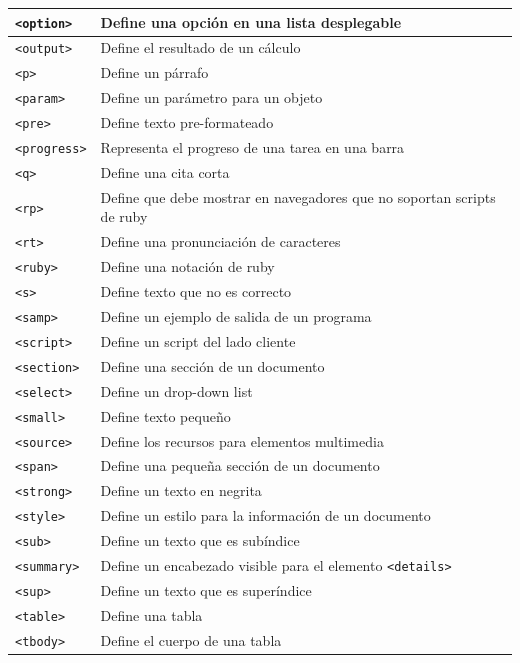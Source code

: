 \documentclass[11pt]{scrartcl}
\begin{document}
\begin{longtable}{|p{}|p{}|}
\texttt{<option>} & Define una opción en una lista desplegable \\
\hline
\texttt{<output>} & Define el resultado de un cálculo \\
\hline
\texttt{<p>} & Define un párrafo \\
\hline
\texttt{<param>} & Define un parámetro para un objeto \\
\hline
\texttt{<pre>} & Define texto pre-formateado \\
\hline
\texttt{<progress>} & Representa el progreso de una tarea en una barra \\
\hline
\texttt{<q>} & Define una cita corta \\
\hline
\texttt{<rp>} & Define que debe mostrar en navegadores que no soportan scripts de ruby \\
\hline
\texttt{<rt>} & Define una pronunciación de caracteres \\
\hline
\texttt{<ruby>} & Define una notación de ruby \\
\hline
\texttt{<s>} & Define texto que no es correcto \\
\hline
\texttt{<samp>} & Define un ejemplo de salida de un programa \\
\hline
\texttt{<script>} & Define un script del lado cliente \\
\hline
\texttt{<section>} & Define una sección de un documento \\
\hline
\texttt{<select>} & Define un drop-down list \\
\hline
\texttt{<small>} & Define texto pequeño \\
\hline
\texttt{<source>} & Define los recursos para elementos multimedia \\
\hline
\texttt{<span>} & Define una pequeña sección de un documento \\
\hline
\texttt{<strong>} & Define un texto en negrita \\
\hline
\texttt{<style>} & Define un estilo para la información de un documento \\
\hline
\texttt{<sub>} & Define un texto que es subíndice \\
\hline
\texttt{<summary>} & Define un encabezado visible para el elemento \texttt{<details>} \\
\hline
\texttt{<sup>} & Define un texto que es superíndice \\
\hline
\texttt{<table>} & Define una tabla \\
\hline
\texttt{<tbody>} & Define el cuerpo de una tabla \\

\end{longtable}
\end{document}
